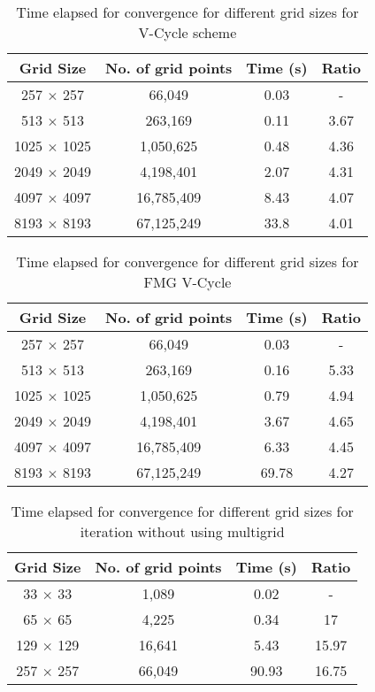 \documentclass[a4paper]{report}
\begin{document}
	\begin{table}
	\caption {Time elapsed for convergence for different grid sizes for V-Cycle scheme} \label{scaling_v_cycle_table} 
	\begin{center}
	\begin{tabular}{ c c c c }
	\hline 
	Grid Size & No. of grid points & Time (s) & Ratio\\ 
	\hline 
	257 $\times$ 257 & 66,049 & 0.03 & -\\ 
	513 $\times$ 513 & 263,169 & 0.11 & 3.67\\
	1025 $\times$ 1025 & 1,050,625 & 0.48 & 4.36\\
	2049 $\times$ 2049 & 4,198,401 & 2.07	& 4.31 \\
	4097 $\times$ 4097 & 16,785,409 & 8.43 & 4.07\\ 
	8193 $\times$ 8193 & 67,125,249 & 33.8 & 4.01 \\ 
	\hline 
	\end{tabular} 
	\end{center}
	\end{table}
	
	
	\begin{table}
	\caption {Time elapsed for convergence for different grid sizes for FMG V-Cycle} \label{scaling_fmg_table} 
	\begin{center}
	\begin{tabular}{ c c c c }
	\hline 
	Grid Size & No. of grid points & Time (s) & Ratio\\ 
	\hline 
	257 $\times$ 257 & 66,049 & 0.03 & -\\ 
	513 $\times$ 513 & 263,169 & 0.16 & 5.33\\ 
	1025 $\times$ 1025 & 1,050,625 & 0.79 & 4.94\\ 
	2049 $\times$ 2049 & 4,198,401 & 3.67 & 4.65\\ 
	4097 $\times$ 4097 & 16,785,409 & 6.33 & 4.45\\
	8193 $\times$ 8193 & 67,125,249 & 69.78 & 4.27 \\ 
	\hline 
	\end{tabular} 
	\end{center}
	\end{table}
	
	
	
	\begin{table}
	\caption {Time elapsed for convergence for different grid sizes for iteration without using multigrid} \label{scaling_table} 
	\begin{center}
	\begin{tabular}{ c c c c }
	\hline 
	Grid Size & No. of grid points & Time (s) & Ratio\\ 
	\hline 
	33 $\times$ 33 & 1,089 & 0.02 & -\\ 
	65 $\times$ 65 & 4,225 & 0.34 & 17\\ 
	129 $\times$ 129 & 16,641 & 5.43 & 15.97\\ 
	257 $\times$ 257 & 66,049 & 90.93 & 16.75\\
	\hline 
	\end{tabular} 
	\end{center}
	\end{table}
	
\end{document}
